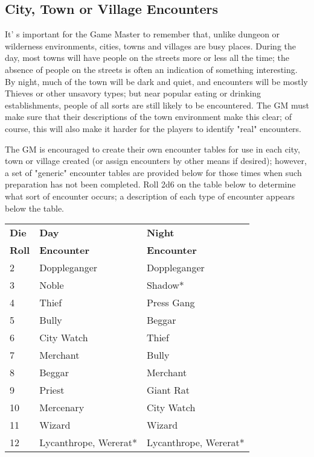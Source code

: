 \documentclass[a4paper,twoside,openany,10pt]{book}
\begin{document}
\begin{multicols}{2}
	
\subsection{City, Town or Village Encounters}\label{city-town-or-village-encounters}

It' s important for the Game Master to remember that, unlike dungeon or wilderness environments, cities, towns and villages are busy places. During the day, most towns will have people on the streets more or less all the time; the absence of people on the streets is often an indication of something interesting. By night, much of the town will be dark and quiet, and encounters will be mostly Thieves or other unsavory types; but near popular eating or drinking establishments, people of all sorts are still likely to be encountered. The GM must make sure that their descriptions of the town environment make this clear; of course, this will also make it harder for the players to identify "real" encounters.

The GM is encouraged to create their own encounter tables for use in each city, town or village created (or assign encounters by other means if desired); however, a set of "generic" encounter tables are provided below for those times when such preparation has not been completed. Roll 2d6 on the table below to determine what sort of encounter occurs; a description of each type of encounter appears below the table.\medskip

\begin{tabular*}{0.93\linewidth}{@{\extracolsep{\fill}}lll}
\textbf{Die} & \textbf{Day} & \textbf{Night}\\
\textbf{Roll}&\textbf{Encounter}&\textbf{Encounter}\\\toprule
2 & Doppleganger & Doppleganger \\\hline
3 & Noble & Shadow* \\\hline
4 & Thief & Press Gang \\\hline
5 & Bully & Beggar \\\hline
6 & City Watch & Thief \\\hline
7 & Merchant & Bully \\\hline
8 & Beggar & Merchant \\\hline
9 & Priest & Giant Rat \\\hline
10 & Mercenary & City Watch \\\hline
11 & Wizard & Wizard \\\hline
12 & Lycanthrope, Wererat* & Lycanthrope, Wererat* \\\bottomrule
\end{tabular*}\medskip


\end{multicols}
\end{document}

